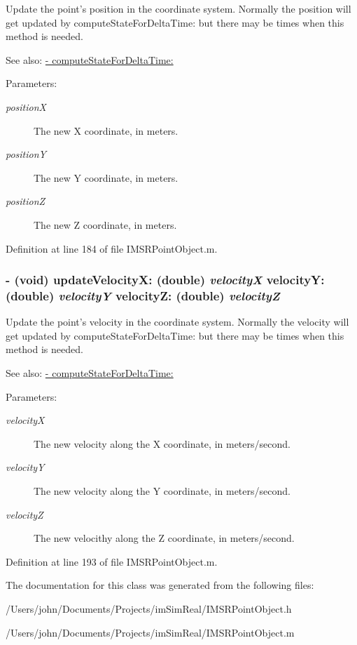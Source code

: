 Update the point's position in the coordinate system. Normally the position will get updated by computeStateForDeltaTime: but there may be times when this method is needed.

\begin{Desc}
\item[See also:]\hyperlink{interface_i_m_s_r_point_object_ae14396d83b2edd2f34b0bfb0f35a501}{- computeStateForDeltaTime:}\end{Desc}
\begin{Desc}
\item[Parameters:]
\begin{description}
\item[{\em positionX}]The new X coordinate, in meters. \item[{\em positionY}]The new Y coordinate, in meters. \item[{\em positionZ}]The new Z coordinate, in meters. \end{description}
\end{Desc}


Definition at line 184 of file IMSRPointObject.m.\hypertarget{interface_i_m_s_r_point_object_55fbe7e8642006b44ebeedc850b5c728}{
\subsubsection[{updateVelocityX:velocityY:velocityZ:}]{\setlength{\rightskip}{0pt plus 5cm}- (void) updateVelocityX: (double) {\em velocityX}\/ velocityY: (double) {\em velocityY}\/ velocityZ: (double) {\em velocityZ}}}
\label{interface_i_m_s_r_point_object_55fbe7e8642006b44ebeedc850b5c728}


Update the point's velocity in the coordinate system. Normally the velocity will get updated by computeStateForDeltaTime: but there may be times when this method is needed.

\begin{Desc}
\item[See also:]\hyperlink{interface_i_m_s_r_point_object_ae14396d83b2edd2f34b0bfb0f35a501}{- computeStateForDeltaTime:}\end{Desc}
\begin{Desc}
\item[Parameters:]
\begin{description}
\item[{\em velocityX}]The new velocity along the X coordinate, in meters/second. \item[{\em velocityY}]The new velocity along the Y coordinate, in meters/second. \item[{\em velocityZ}]The new velocithy along the Z coordinate, in meters/second. \end{description}
\end{Desc}


Definition at line 193 of file IMSRPointObject.m.

The documentation for this class was generated from the following files:\begin{CompactItemize}
\item 
/Users/john/Documents/Projects/imSimReal/IMSRPointObject.h\item 
/Users/john/Documents/Projects/imSimReal/IMSRPointObject.m\end{CompactItemize}
